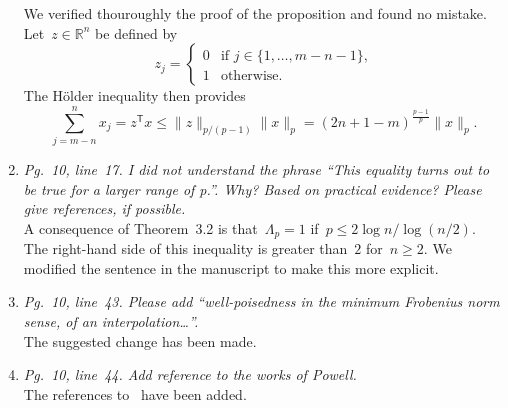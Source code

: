 \documentclass{article}
\begin{document}
\begin{enumerate}
    We verified thouroughly the proof of the proposition and found no mistake.
    Let~$z \in \mathbb{R}^n$ be defined by
    \begin{equation*}
        z_j = \begin{cases}
            0 & \text{if~$j \in \{ 1, \dots, m - n - 1 \}$,} \\
            1 & \text{otherwise.}
        \end{cases}
    \end{equation*}
    The H{\"{o}}lder inequality then provides
    \begin{equation*}
        \sum_{j = m - n}^n x_j = z^{\mathsf{T}} x \le \lVert z \rVert_{p / (p - 1)} \lVert x \rVert_p = (2n + 1 - m)^{\frac{p - 1}{p}} \lVert x \rVert_p.
    \end{equation*}
    \item \textit{Pg.~10, line~17. I did not understand the phrase ``This equality turns out to be true for a larger range of p.''. Why? Based on practical evidence? Please give references, if possible.}\\
    A consequence of Theorem~3.2 is that~$\Lambda_p = 1$ if~$p \le 2 \log n / \log (n / 2)$.
    The right-hand side of this inequality is greater than~$2$ for~$n \ge 2$.
    We modified the sentence in the manuscript to make this more explicit.
    \item \textit{Pg.~10, line~43. Please add ``well-poisedness in the minimum Frobenius norm sense, of an interpolation\dots''.}\\
    The suggested change has been made.
    \item \textit{Pg.~10, line~44. Add reference to the works of Powell.}\\
    The references to~\cite{Powell_2006,Powell_2009} have been added.
\end{enumerate}



\end{document}
